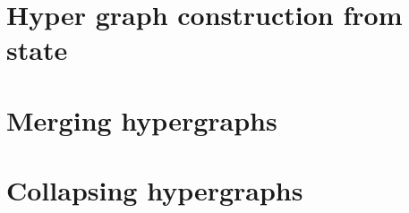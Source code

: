 \documentclass[../Master.tex]{subfiles}
\begin{document}
\section{Hyper graph construction from state}
	

\section{Merging hypergraphs}\label{sec:C:HGMerging}
    

\section{Collapsing hypergraphs}
	

%	
\end{document}
